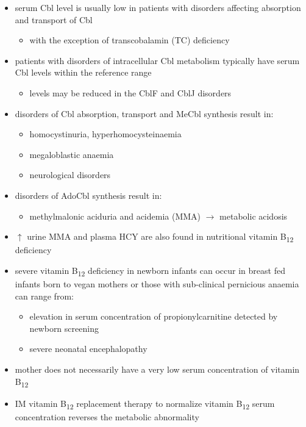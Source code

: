 \documentclass{scrartcl}
\begin{document}
\begin{itemize}
\item serum Cbl level is usually low in patients with disorders affecting
absorption and transport of Cbl
\begin{itemize}
\item with the exception of transcobalamin (TC) deficiency
\end{itemize}
\item patients with disorders of intracellular Cbl metabolism typically
have serum Cbl levels within the reference range
\begin{itemize}
\item levels may be reduced in the CblF and CblJ disorders
\end{itemize}
\item disorders of Cbl absorption, transport and MeCbl synthesis result in:
\begin{itemize}
\item homocystinuria, hyperhomocysteinaemia
\item megaloblastic anaemia
\item neurological disorders
\end{itemize}
\item disorders of AdoCbl synthesis result in:
\begin{itemize}
\item methylmalonic aciduria and acidemia (MMA) \(\to\) metabolic
acidosis
\end{itemize}
\item \(\uparrow\) urine MMA and plasma HCY are also found in nutritional
vitamin B\textsubscript{12} deficiency
\item severe vitamin B\textsubscript{12} deficiency in newborn infants can occur in
breast fed infants born to vegan mothers or those with sub-clinical
pernicious anaemia can range from:
\begin{itemize}
\item elevation in serum concentration of propionylcarnitine detected by
newborn screening
\item severe neonatal encephalopathy
\end{itemize}
\item mother does not necessarily have a very low serum concentration of
vitamin B\textsubscript{12}
\item IM vitamin B\textsubscript{12} replacement therapy to normalize vitamin B\textsubscript{12} serum
concentration reverses the metabolic abnormality
\end{itemize}
\end{document}
